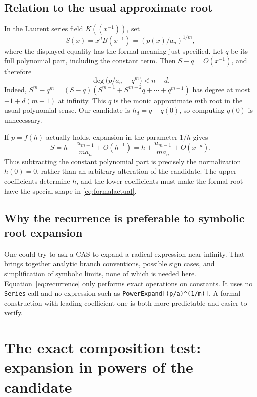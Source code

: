 \documentclass[11pt,letterpaper]{article}
\theoremstyle{definition}
\theoremstyle{remark}
\newcommand{\wt}[1]{\texttt{#1}}
\begin{document}
\subsection{Relation to the usual approximate root}
In the Laurent series field $K((x^{-1}))$, set
\[
 S(x)=x^d B(x^{-1})=(p(x)/a_n)^{1/m},
\]
where the displayed equality has the formal meaning just specified.
Let $q$ be its full polynomial part, including the constant term. Then
$S-q=O(x^{-1})$, and therefore
\begin{equation}\label{eq:approxroot}
 \deg\bigl(p/a_n-q^m\bigr)<n-d.
\end{equation}
Indeed, $S^m-q^m=(S-q)(S^{m-1}+S^{m-2}q+\cdots+q^{m-1})$
has degree at most $-1+d(m-1)$ at infinity.
This $q$ is the monic approximate $m$th root in the usual polynomial
sense. Our candidate is $h_d=q-q(0)$, so computing $q(0)$ is unnecessary.

If $p=f(h)$ actually holds, expansion in the parameter $1/h$ gives
\begin{equation}\label{eq:formalactual}
 S=h+\frac{u_{m-1}}{m a_n}+O(h^{-1})
   =h+\frac{u_{m-1}}{m a_n}+O(x^{-d}).
\end{equation}
Thus subtracting the constant polynomial part is precisely the
normalization $h(0)=0$, rather than an arbitrary alteration of the
candidate. The upper coefficients determine $h$, and the lower coefficients
must make the formal root have the special shape in
\eqref{eq:formalactual}.

\subsection{Why the recurrence is preferable to symbolic root expansion}
One could try to ask a CAS to expand a radical expression near infinity.
That brings together analytic branch conventions, possible sign cases,
and simplification of symbolic limits, none of which is needed here.
Equation~\eqref{eq:recurrence} only performs exact operations on constants.
It uses no \wt{Series} call and no expression such as
\wt{PowerExpand[(p/a)\string^(1/m)]}. A formal construction with leading
coefficient one is both more predictable and easier to verify.

\section{The exact composition test: expansion in powers of the candidate}
\label{sec:hadic}
\end{document}
